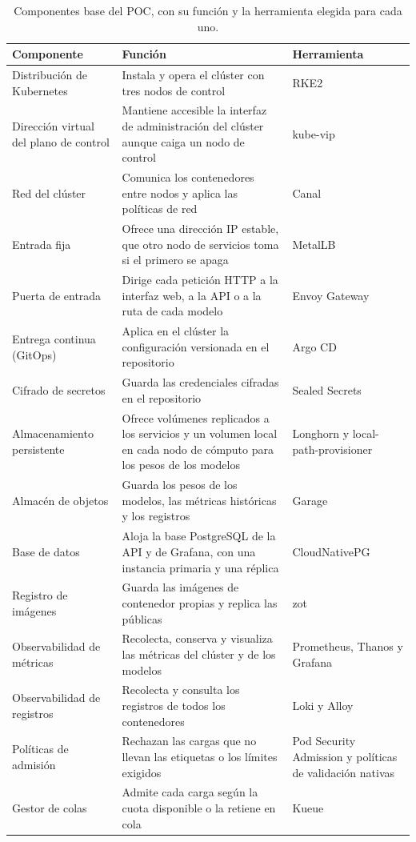 \begin{table}[H]
  \centering
  \small
  \renewcommand{\arraystretch}{1.3}
  \caption{Componentes base del POC, con su función y la herramienta elegida para cada uno.}
  \label{tab:componentes-poc}
  \begin{tabularx}{\textwidth}{>{\raggedright\arraybackslash}p{} >{\raggedright\arraybackslash}X >{\raggedright\arraybackslash}p{}}
    \toprule
    \textbf{Componente} & \textbf{Función} & \textbf{Herramienta} \\
    \midrule
    Distribución de Kubernetes & Instala y opera el clúster con tres nodos de control & RKE2 \\
    Dirección virtual del plano de control & Mantiene accesible la interfaz de administración del clúster aunque caiga un nodo de control & kube-vip \\
    Red del clúster & Comunica los contenedores entre nodos y aplica las políticas de red & Canal \\
    Entrada fija & Ofrece una dirección IP estable, que otro nodo de servicios toma si el primero se apaga & MetalLB \\
    Puerta de entrada & Dirige cada petición HTTP a la interfaz web, a la API o a la ruta de cada modelo & Envoy Gateway \\
    Entrega continua (GitOps) & Aplica en el clúster la configuración versionada en el repositorio & Argo CD \\
    Cifrado de secretos & Guarda las credenciales cifradas en el repositorio & Sealed Secrets \\
    Almacenamiento persistente & Ofrece volúmenes replicados a los servicios y un volumen local en cada nodo de cómputo para los pesos de los modelos & Longhorn y local-path-provisioner \\
    Almacén de objetos & Guarda los pesos de los modelos, las métricas históricas y los registros & Garage \\
    Base de datos & Aloja la base PostgreSQL de la API y de Grafana, con una instancia primaria y una réplica & CloudNativePG \\
    Registro de imágenes & Guarda las imágenes de contenedor propias y replica las públicas & zot \\
    Observabilidad de métricas & Recolecta, conserva y visualiza las métricas del clúster y de los modelos & Prometheus, Thanos y Grafana \\
    Observabilidad de registros & Recolecta y consulta los registros de todos los contenedores & Loki y Alloy \\
    Políticas de admisión & Rechazan las cargas que no llevan las etiquetas o los límites exigidos & Pod Security Admission y políticas de validación nativas \\
    Gestor de colas & Admite cada carga según la cuota disponible o la retiene en cola & Kueue \\
    \bottomrule
  \end{tabularx}
\end{table}

